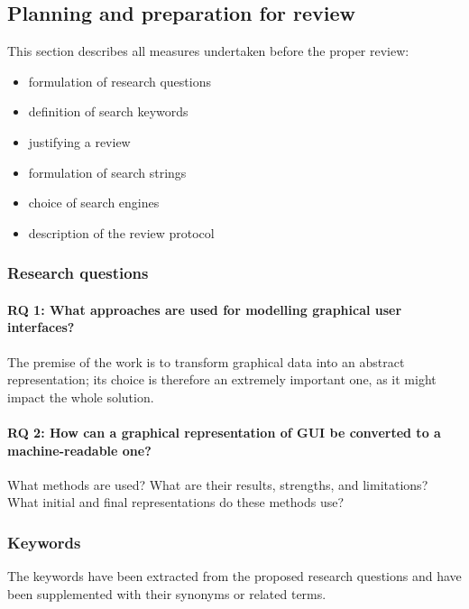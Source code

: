 \subsection[Planning and preparation]{Planning and preparation for review}\label{subsec:planning-and-preparation-for-review}

This section describes all measures undertaken before the proper review:
\begin{itemize}
    \item formulation of research questions
    \item definition of search keywords
    \item justifying a review
    \item formulation of search strings
    \item choice of search engines
    \item description of the review protocol
\end{itemize}

\subsubsection{Research questions}


\paragraph{RQ 1: What approaches are used for modelling graphical user interfaces?}
The premise of the work is to transform graphical data into an abstract representation;
its choice is therefore an extremely important one, as it might impact the whole solution.

\paragraph{RQ 2: How can a graphical representation of GUI be converted to a machine-readable one?}
What methods are used?
What are their results, strengths, and limitations?
What initial and final representations do these methods use?

\subsubsection{Keywords}
The keywords have been extracted from the proposed research questions
and have been supplemented with their synonyms or related terms.

